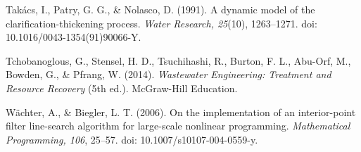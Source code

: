 \documentclass[a4paper,fleqn]{cas-sc}
\begin{document}
\noindent Tak\'acs, I., Patry, G. G., \& Nolasco, D. (1991). A dynamic model of the clarification-thickening process. \textit{Water Research, 25}(10), 1263--1271. doi: 10.1016/0043-1354(91)90066-Y.

\noindent Tchobanoglous, G., Stensel, H. D., Tsuchihashi, R., Burton, F. L., Abu-Orf, M., Bowden, G., \& Pfrang, W. (2014). \textit{Wastewater Engineering: Treatment and Resource Recovery} (5th ed.). McGraw-Hill Education.

\noindent W\"achter, A., \& Biegler, L. T. (2006). On the implementation of an interior-point filter line-search algorithm for large-scale nonlinear programming. \textit{Mathematical Programming, 106}, 25--57. doi: 10.1007/s10107-004-0559-y.
\end{document}
